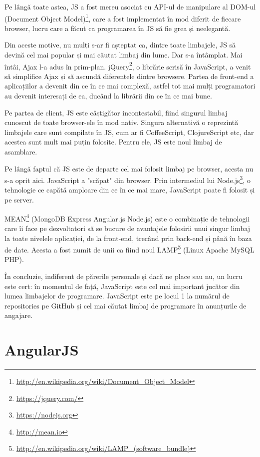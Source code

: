 Pe lângă toate astea, JS a fost mereu asociat cu API-ul de manipulare al DOM-ul 
(Document Object Model)\footnote{\url{http://en.wikipedia.org/wiki/Document\_Object\_Model}},
care a fost implementat în mod diferit
de fiecare browser, lucru care a făcut ca programarea în JS să fie
grea și neelegantă.

Din aceste motive, nu mulți s-ar fi așteptat ca, dintre toate
limbajele, JS să devină cel mai popular și mai căutat limbaj din
lume. Dar s-a întâmplat. Mai întâi, Ajax l-a adus în prim-plan.
jQuery\footnote{\url{https://jquery.com/}}, o librărie scrisă în JavaScript, a venit să simplifice 
Ajax și să ascundă diferențele dintre
browsere. Partea de front-end a aplicațiilor a devenit din ce
în ce mai complexă, astfel tot mai mulți programatori au
devenit interesați de ea, ducând la librării din ce în ce mai bune.

Pe partea de client, JS este câștigător incontestabil, fiind
singurul limbaj cunoscut de toate browser-ele în mod nativ.
Singura alternativă o reprezintă limbajele care sunt compilate
în JS, cum ar fi CoffeeScript, ClojureScript etc, dar acestea
sunt mult mai puțin folosite. Pentru ele, JS este
noul limbaj de asamblare.

Pe lângă faptul că JS este de departe cel mai folosit limbaj
pe browser, acesta nu s-a oprit aici. JavaScript a "scăpat" din browser.
Prin intermediul lui Node.js\footnote{\url{https://nodejs.org}}, 
o tehnologie ce capătă amploare 
din ce în ce mai mare, JavaScript poate fi folosit
și pe server. 

MEAN\footnote{\url{http://mean.io}} (MongoDB Express Angular.js Node.js) 
este o combinație de tehnologii
care îi face pe dezvoltatori să se bucure de avantajele folosirii
unui singur limbaj la toate nivelele aplicației, de la front-end,
trecând prin back-end și până în baza de date. Acesta a fost numit
de unii ca fiind noul 
LAMP\footnote{\url{http://en.wikipedia.org/wiki/LAMP\_(software\_bundle)}}
(Linux Apache MySQL PHP).

În concluzie, indiferent de părerile personale și dacă ne place
sau nu, un lucru este cert: în momentul de față, JavaScript
este cel mai important jucător din lumea limbajelor
de programare. JavaScript este pe locul 1 la numărul de
repositories pe GitHub și cel mai căutat limbaj de programare
în anunțurile de angajare.

\section{AngularJS}

